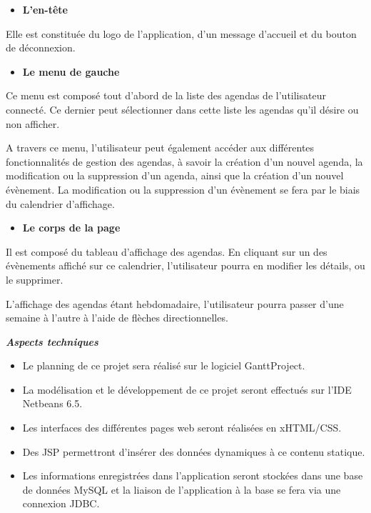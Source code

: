 \documentclass[12pt , a4paper]{article}
\begin{document}
\begin{itemize}
\item \textbf{L{\textquoteright}en-t\^ete}
\end{itemize}
Elle est constitu\'ee du logo de l{\textquoteright}application,
d{\textquoteright}un message d{\textquoteright}accueil et du bouton de
d\'econnexion.

\begin{itemize}
\item \textbf{Le menu de gauche~}
\end{itemize}
Ce menu est compos\'e tout d{\textquoteright}abord de la liste des
agendas de l{\textquoteright}utilisateur connect\'e. Ce dernier peut
s\'electionner dans cette liste les agendas qu{\textquoteright}il
d\'esire ou non afficher.

A travers ce menu, l{\textquoteright}utilisateur peut \'egalement
acc\'eder aux diff\'erentes fonctionnalit\'es de gestion des agendas,
\`a savoir la cr\'eation d{\textquoteright}un nouvel agenda, la
modification ou la suppression d{\textquoteright}un agenda, ainsi que
la cr\'eation d{\textquoteright}un nouvel \'ev\`enement. La
modification ou la suppression d{\textquoteright}un \'ev\`enement se
fera par le biais du calendrier d{\textquoteright}affichage.


\begin{itemize}
\item \textbf{Le corps de la page}
\end{itemize}
Il est compos\'e du tableau d{\textquoteright}affichage des agendas. En
cliquant sur un des \'ev\`enements affich\'e sur ce calendrier,
l{\textquoteright}utilisateur pourra en modifier les d\'etails, ou le
supprimer.



L{\textquoteright}affichage des agendas \'etant hebdomadaire,
l{\textquoteright}utilisateur pourra passer d{\textquoteright}une
semaine \`a l{\textquoteright}autre \`a l{\textquoteright}aide de
fl\`eches directionnelles.

{\centering
\textbf{\textit{\textcolor[rgb]{0.0,0.4392157,0.7529412}{Aspects
techniques}}}
\par}

\begin{itemize}
\item Le planning de ce projet sera r\'ealis\'e sur le logiciel
GanttProject.
\item La mod\'elisation et le d\'eveloppement de ce projet seront
effectu\'es sur l{\textquoteright}IDE Netbeans 6.5.
\item Les interfaces des diff\'erentes pages web seront r\'ealis\'ees en
xHTML/CSS.
\item Des JSP permettront d{\textquoteright}ins\'erer des donn\'ees
dynamiques \`a ce contenu statique.
\item Les informations enregistr\'ees dans l{\textquoteright}application
seront stock\'ees dans une base de donn\'ees MySQL et la liaison de
l{\textquoteright}application \`a la base se fera via une connexion
JDBC.
\end{itemize}
\end{document}
